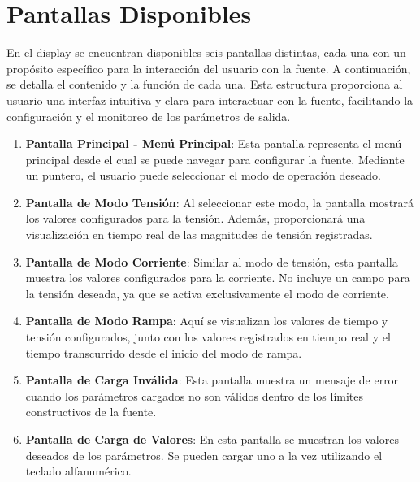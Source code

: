 \section{Pantallas Disponibles} 
En el display se encuentran disponibles seis pantallas distintas, cada una con un propósito específico para la interacción del usuario con la fuente. A continuación, se detalla el contenido y la función de cada una.
Esta estructura proporciona al usuario una interfaz intuitiva y clara para interactuar con la fuente, facilitando la configuración y el monitoreo de los parámetros de salida.
\begin{enumerate}
    \item \textbf{Pantalla Principal - Menú Principal}: Esta pantalla representa el menú principal desde el cual se puede navegar para configurar la fuente. Mediante un puntero, el usuario puede seleccionar el modo de operación deseado.
    \item \textbf{Pantalla de Modo Tensión}: Al seleccionar este modo, la pantalla mostrará los valores configurados para la tensión. Además, proporcionará una visualización en tiempo real de las magnitudes de tensión registradas.
    \item \textbf{Pantalla de Modo Corriente}: Similar al modo de tensión, esta pantalla muestra los valores configurados para la corriente. No incluye un campo para la tensión deseada, ya que se activa exclusivamente el modo de corriente.
    \item \textbf{Pantalla de Modo Rampa}: Aquí se visualizan los valores de tiempo y tensión configurados, junto con los valores registrados en tiempo real y el tiempo transcurrido desde el inicio del modo de rampa.
    \item \textbf{Pantalla de Carga Inválida}: Esta pantalla muestra un mensaje de error cuando los parámetros cargados no son válidos dentro de los límites constructivos de la fuente.
    \item \textbf{Pantalla de Carga de Valores}: En esta pantalla se muestran los valores deseados de los parámetros. Se pueden cargar uno a la vez utilizando el teclado alfanumérico.
\end{enumerate}













